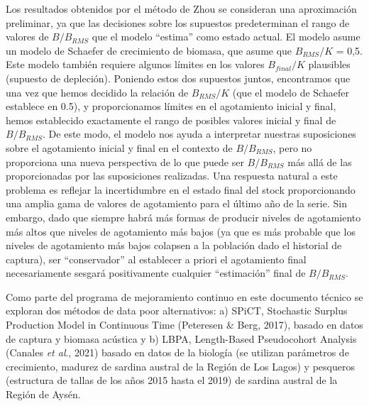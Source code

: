 \documentclass[
  spanish,
]{article}
\begin{document}
Los resultados obtenidos por el método de Zhou se consideran una
aproximación preliminar, ya que las decisiones sobre los supuestos
predeterminan el rango de valores de \(B/B_{RMS}\) que el modelo
``estima'' como estado actual. El modelo asume un modelo de Schaefer de
crecimiento de biomasa, que asume que \(B_{RMS}/K\) = 0,5. Este modelo
también requiere algunos límites en los valores \(B_{final}/K\)
plausibles (supuesto de depleción). Poniendo estos dos supuestos juntos,
encontramos que una vez que hemos decidido la relación de \(B_{RMS}/K\)
(que el modelo de Schaefer establece en 0.5), y proporcionamos límites
en el agotamiento inicial y final, hemos establecido exactamente el
rango de posibles valores inicial y final de \(B/B_{RMS}\). De este
modo, el modelo nos ayuda a interpretar nuestras suposiciones sobre el
agotamiento inicial y final en el contexto de \(B/B_{RMS}\), pero no
proporciona una nueva perspectiva de lo que puede ser \(B/B_{RMS}\) más
allá de las proporcionadas por las suposiciones realizadas. Una
respuesta natural a este problema es reflejar la incertidumbre en el
estado final del stock proporcionando una amplia gama de valores de
agotamiento para el último año de la serie. Sin embargo, dado que
siempre habrá más formas de producir niveles de agotamiento más altos
que niveles de agotamiento más bajos (ya que es más probable que los
niveles de agotamiento más bajos colapsen a la población dado el
historial de captura), ser ``conservador'' al establecer a priori el
agotamiento final necesariamente sesgará positivamente cualquier
``estimación'' final de \(B/B_{RMS}\).

Como parte del programa de mejoramiento continuo en este documento
técnico se exploran dos métodos de data poor alternativos: a) SPiCT,
Stochastic Surplus Production Model in Continuous Time (Peteresen \&
Berg, 2017), basado en datos de captura y biomasa acústica y b) LBPA,
Length-Based Pseudocohort Analysis (Canales \emph{et al}., 2021) basado
en datos de la biología (se utilizan parámetros de crecimiento, madurez
de sardina austral de la Región de Los Lagos) y pesqueros (estructura de
tallas de los años 2015 hasta el 2019) de sardina austral de la Región
de Aysén.
\end{document}
